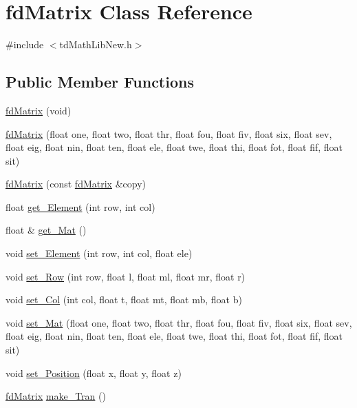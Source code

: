 \hypertarget{classfd_matrix}{}\section{fd\+Matrix Class Reference}
\label{classfd_matrix}


{\ttfamily \#include $<$td\+Math\+Lib\+New.\+h$>$}

\subsection*{Public Member Functions}
\begin{DoxyCompactItemize}
\item 
\hyperlink{classfd_matrix_a4e97779c76db0686a11102353b0ed015}{fd\+Matrix} (void)
\item 
\hyperlink{classfd_matrix_a53237656ab43ee457035cefc442ef568}{fd\+Matrix} (float one, float two, float thr, float fou, float fiv, float six, float sev, float eig, float nin, float ten, float ele, float twe, float thi, float fot, float fif, float sit)
\item 
\hyperlink{classfd_matrix_aeaeab2c9d844bcbe721c2dba9f6c0b9d}{fd\+Matrix} (const \hyperlink{classfd_matrix}{fd\+Matrix} \&copy)
\item 
float \hyperlink{classfd_matrix_adc766258b224549bfa242acd2b83b1fd}{get\+\_\+\+Element} (int row, int col)
\item 
float \& \hyperlink{classfd_matrix_a523606adda02a993fd940d6fc4a1a0a2}{get\+\_\+\+Mat} ()
\item 
void \hyperlink{classfd_matrix_a8036052328d87b7b5af3c1e9ddbe3a6b}{set\+\_\+\+Element} (int row, int col, float ele)
\item 
void \hyperlink{classfd_matrix_a1e45875cef8577b3165990336095e92c}{set\+\_\+\+Row} (int row, float l, float ml, float mr, float r)
\item 
void \hyperlink{classfd_matrix_a28f9ba15893b5b8b4571819c1135f44a}{set\+\_\+\+Col} (int col, float t, float mt, float mb, float b)
\item 
void \hyperlink{classfd_matrix_a7972da65e7020b48329e20a7f9e2436e}{set\+\_\+\+Mat} (float one, float two, float thr, float fou, float fiv, float six, float sev, float eig, float nin, float ten, float ele, float twe, float thi, float fot, float fif, float sit)
\item 
void \hyperlink{classfd_matrix_a5bddd54d329db322915dc2303fda2dde}{set\+\_\+\+Position} (float x, float y, float z)
\item 
\hyperlink{classfd_matrix}{fd\+Matrix} \hyperlink{classfd_matrix_a8da66a008b9eb84778017cd35232d17f}{make\+\_\+\+Tran} ()

\end{DoxyCompactItemize}
